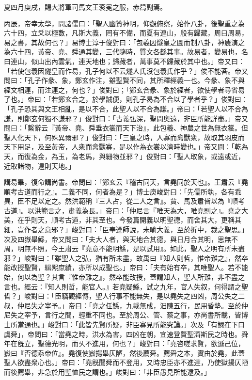 \begin{pinyinscope}
 
 
 
 夏四月庚戌，賜大將軍司馬文王衮冕之服，赤舄副焉。
 
 
 
 
 丙辰，帝幸太學，問諸儒曰：「聖人幽贊神明，仰觀俯察，始作八卦，後聖重之為六十四，立爻以極數，凡斯大義，罔有不備，而夏有連山，殷有歸藏，周曰周易，易之書，其故何也？」易博士淳于俊對曰：「包羲因燧皇之圖而制八卦，神農演之為六十四，黃帝、堯、舜通其變，三代隨時，質文各繇其事。故易者，變易也，名曰連山，似山出內雲氣，連天地也；歸藏者，萬事莫不歸藏於其中也。」帝又曰：「若使包羲因燧皇而作易，孔子何以不云燧人氏沒包羲氏作乎？」俊不能荅。帝又問曰：「孔子作彖、象，鄭玄作注，雖聖賢不同，其所釋經義一也。今彖、象不與經文相連，而注連之，何也？」俊對曰；「鄭玄合彖、象於經者，欲使學者尋省易了也。」帝曰：「若鄭玄合之，於學誠便，則孔子曷為不合以了學者乎？」俊對曰：「孔子恐其與文王相亂，是以不合，此聖人以不合為謙。」帝曰：「若聖人以不合為謙，則鄭玄何獨不謙邪？」俊對曰：「古義弘深，聖問奧遠，非臣所能詳盡。」帝又問曰：「繫辭云『黃帝、堯、舜垂衣裳而天下治』，此包羲、神農之世為無衣裳。但聖人化天下，何殊異爾邪？」俊對曰：「三皇之時，人寡而禽獸衆，故取其羽皮而天下用足，及至黃帝，人衆而禽獸寡，是以作為衣裳以濟時變也。」帝又問：「乾為天，而復為金，為玉，為老馬，與細物並邪？」俊對曰：「聖人取象，或遠或近，近取諸物，遠則天地。」
 
 
 
 
 講易畢，復命講尚書。帝問曰：「鄭玄云『稽古同天，言堯同於天也』。王肅云『堯順考古道而行之』。二義不同，何者為是？」博士庾峻對曰：「先儒所執，各有乖異，臣不足以定之。然洪範稱『三人占，從二人之言』。賈、馬及肅皆以為『順考古道』。以洪範言之，肅義為長。」帝曰：「仲尼言『唯天為大，唯堯則之』。堯之大美，在乎則天，順考古道，非其至也。今發篇開義以明聖德，而舍其大，更稱其細，豈作者之意邪？」峻對曰：「臣奉遵師說，未喻大義，至於折中，裁之聖思。」次及四嶽舉鯀，帝又問曰：「夫大人者，與天地合其德，與日月合其明，思無不周，明無不照，今王肅云『堯意不能明鯀，是以試用』。如此，聖人之明有所未盡邪？」峻對曰：「雖聖人之弘，猶有所未盡，故禹曰『知人則哲，惟帝難之』，然卒能改授聖賢，緝熈庶績，亦所以成聖也。」帝曰：「夫有始有卒，其唯聖人。若不能始，何以為聖？其言『惟帝難之』，然卒能改授，蓋謂知人，聖人所難，非不盡之言也。經云：『知人則哲，能官人。』若堯疑鯀，試之九年，官人失叙，何得謂之聖哲？」峻對曰：「臣竊觀經傳，聖人行事不能無失，是以堯失之四凶，周公失之二叔，仲尼失之宰予。」帝曰：「堯之任鯀，九載無成，汨陳五行，民用昏墊。至於仲尼失之宰予，言行之間，輕重不同也。至於周公、管、蔡之事，亦尚書所載，皆博士所當通也。」峻對曰：「此皆先賢所疑，非臣寡見所能究論。」次及「有鰥在下曰虞舜」，帝問曰：「當堯之時，洪水為害，四凶在朝，宜速登賢聖濟斯民之時也。舜年在旣立，聖德光明，而乆不進用，何也？」峻對曰：「堯咨嗟求賢，欲遜己位，嶽曰『否德忝帝位』。堯復使嶽揚舉仄陋，然後薦舜。薦舜之本，實由於堯，此蓋聖人欲盡衆心也。」帝曰：「堯旣聞舜而不登用，又時忠臣亦不進達，乃使獄揚仄陋而後薦舉，非急於用聖恤民之謂也。」峻對曰：「非臣愚見所能逮及。」
 

\end{pinyinscope}
